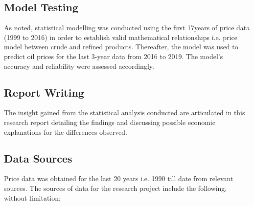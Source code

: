 \documentclass[a4paper,10pt]{article}
\begin{document}
\subsection*{Model Testing}
As noted, statistical modelling was conducted using the first 17years of price data (1999 to 2016) in order to establish valid mathematical relationships i.e. price model between crude and refined products. Thereafter, the model was used to predict oil prices for the last 3-year data from 2016 to 2019. The model’s accuracy and reliability were assessed accordingly.

\subsection*{Report Writing}
The insight gained from the statistical analysis conducted are articulated in this research report detailing the findings and discussing possible economic explanations for the differences observed.

\subsection{Data Sources}
Price data was obtained for the last 20 years i.e. 1990 till date from relevant sources. The sources of data for the research project include the following, without limitation;
\end{document}
